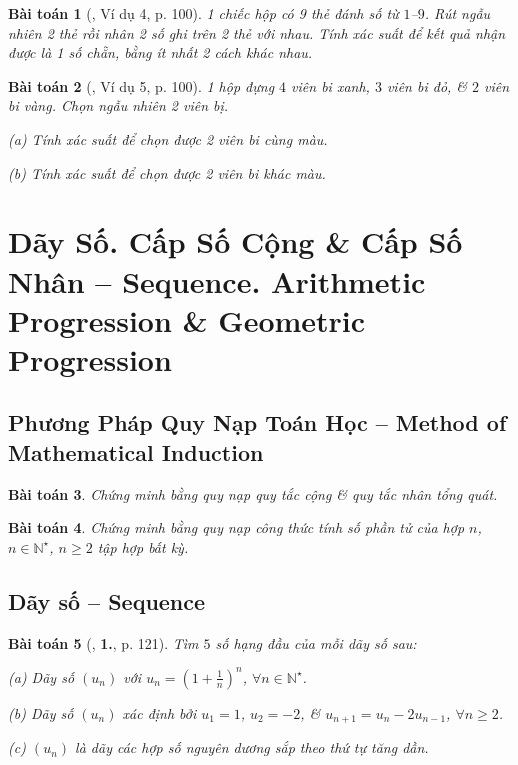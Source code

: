 \documentclass{article}
\numberwithin{equation}{section}
\newtheorem{baitoan}{Bài toán}[section]
\begin{document}
\begin{baitoan}[\cite{TL_chuyen_Toan_Dai_So_Giai_Tich_11}, Ví dụ 4, p. 100]
	1 chiếc hộp có 9 thẻ đánh số từ $1$--$9$. Rút ngẫu nhiên 2 thẻ rồi nhân 2 số ghi trên 2 thẻ với nhau. Tính xác suất để kết quả nhận được là 1 số chẵn, bằng ít nhất 2 cách khác nhau.
\end{baitoan}

\begin{baitoan}[\cite{TL_chuyen_Toan_Dai_So_Giai_Tich_11}, Ví dụ 5, p. 100]
	1 hộp đựng $4$ viên bi xanh, $3$ viên bi đỏ, \& $2$ viên bi vàng. Chọn ngẫu nhiên 2 viên bị.
	\begin{enumerate*}
		\item[(a)] Tính xác suất để chọn được 2 viên bi cùng màu.
		\item[(b)] Tính xác suất để chọn được 2 viên bi khác màu.
	\end{enumerate*}
\end{baitoan}


\section{Dãy Số. Cấp Số Cộng \& Cấp Số Nhân -- Sequence. Arithmetic Progression \& Geometric Progression}

\subsection{Phương Pháp Quy Nạp Toán Học -- Method of Mathematical Induction}

\begin{baitoan}
	Chứng minh bằng quy nạp quy tắc cộng \& quy tắc nhân tổng quát.
\end{baitoan}

\begin{baitoan}
	Chứng minh bằng quy nạp công thức tính số phần tử của hợp $n$, $n\in\mathbb{N}^\star$, $n\ge 2$ tập hợp bất kỳ.
\end{baitoan}


\subsection{Dãy số -- Sequence}

\begin{baitoan}[\cite{TL_chuyen_Toan_Dai_So_Giai_Tich_11}, \textbf{1.}, p. 121]
	Tìm $5$ số hạng đầu của mỗi dãy số sau:
	\begin{enumerate*}
		\item[(a)] Dãy số $(u_n)$ với $u_n = \left(1 + \frac{1}{n}\right)^n$, $\forall n\in\mathbb{N}^\star$.
		\item[(b)] Dãy số $(u_n)$ xác định bởi $u_1 = 1$, $u_2 = -2$, \& $u_{n+1} = u_n - 2u_{n-1}$, $\forall n\ge 2$.
		\item[(c)] $(u_n)$ là dãy các hợp số nguyên dương sắp theo thứ tự tăng dần.
	\end{enumerate*}
\end{baitoan}
\end{document}
